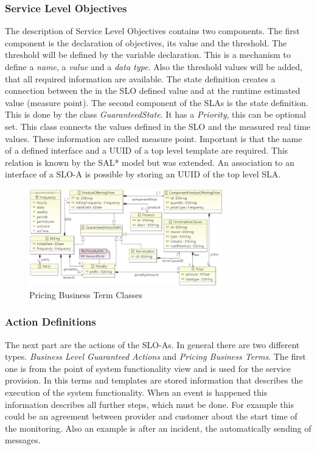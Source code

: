 \subsubsection{Service Level Objectives}
The description of Service Level Objectives contains two components. The first component is the declaration of objectives, its value and the threshold. The threshold will be defined by the variable declaration. This is a mechanism to define a {\it name}, a {\it value} and a {\it data type}. Also the threshold values will be added, that all required information are available. The state definition creates a connection between the in the SLO defined value and at the runtime estimated value (measure point). The second component of the SLAs is the state definition. This is done by the class {\it GuaranteedState}. It has a {\it Priority}, this can be optional set. This class connects the values defined in the SLO and the measured real time values. These information are called measure point. Important is that the name of a defined interface and a UUID of a top level template are required. This relation is known by the SAL* model but was extended. An association to an interface of a SLO-A is possible by storing an UUID of the top level SLA.
\begin{figure}[ht]
\begin{center}
\includegraphics[width=0.75\textwidth]{fig/sloa_business_actions.png}
\end{center}
\caption{Pricing Business Term Classes}
\label{fig:pricing_business}
\end{figure}

\subsubsection{Action Definitions}
The next part are the actions of the SLO-As. In general there are two different types. {\it Business Level Guaranteed Actions} and {\it Pricing Business Terms}. The first one is from the point of system functionality view and is used for the service provision. In this terms and templates are stored information that describes the execution of the system functionality. When an event is happened this information describes all further steps, which must be done. For example this could be an agreement between provider and customer about the start time of the monitoring. Also an example is after an incident, the automatically sending of messages.

